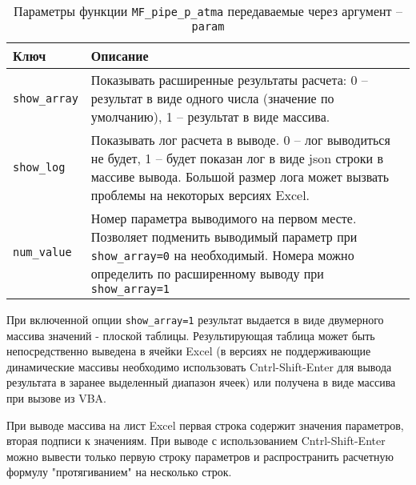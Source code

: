 \begin{table}[H]
	\caption{Параметры функции \texttt{MF_pipe_p_atma} передаваемые через аргумент -- \texttt{param}}
	\label{table:param_list_pipe}
	\begin{tabular}{p{}p{}}
		\hline
		Ключ & Описание  \\ \hline
		\texttt{show_array} & Показывать расширенные результаты расчета: 0 -- результат в виде одного числа (значение по умолчанию), 1 -- результат в виде массива.    \\ \hline
		
		\texttt{show_log} & Показывать лог расчета в выводе. 0 -- лог выводиться не будет, 1 -- будет показан лог в виде json строки в массиве вывода. Большой размер лога может вызвать проблемы на некоторых версиях Excel.   \\ \hline
		
		\texttt{num_value} & Номер параметра выводимого на первом месте. Позволяет подменить выводимый параметр при \texttt{show_array=0} на необходимый. Номера можно определить по расширенному выводу при \texttt{show_array=1}  \\ \hline
		
	\end{tabular}
\end{table}

При включенной опции \texttt{show_array=1} результат выдается в виде двумерного массива значений - плоской таблицы. Результирующая таблица может быть непосредственно выведена в ячейки Excel (в версиях не поддерживающие динамические массивы необходимо использовать Cntrl-Shift-Enter для вывода результата в заранее выделенный диапазон ячеек) или получена в виде массива при вызове из VBA.

При выводе массива на лист Excel первая строка содержит значения параметров, вторая подписи к значениям. При выводе с использованием Cntrl-Shift-Enter можно вывести только первую строку параметров и распространить расчетную формулу "протягиванием" на несколько строк.


